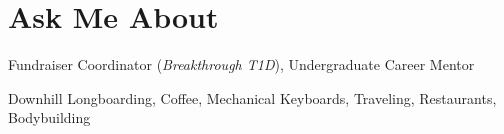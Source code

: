 \documentclass[letterpaper,11pt]{article}
\makeatletter
\newcommand{\resumeItem}[1]{
  \item\small{
    {#1 \vspace{-1pt}}
  }
}
\newcommand{\resumeProjectHeading}[2]{
    \item
    \begin{tabular*}{1.00\textwidth}{l@{\extracolsep{\fill}}r}
      \small#1 & \small{#2} \\
    \end{tabular*}\vspace{-7pt}
}
\newcommand{\resumeSubHeadingListStart}{\begin{itemize}[leftmargin=0in, label={}]\vspace{-3pt}}
\newcommand{\resumeSubHeadingListEnd}{\end{itemize}}
\newcommand{\resumeItemListStart}{\begin{itemize}
[leftmargin=0.2in]}
\newcommand{\resumeItemListEnd}{\end{itemize}}
\makeatother
\begin{document}

\section{Ask Me About}
 \begin{description}[leftmargin=!,labelwidth=\widthof{\small\textit{Activities:XXX}}, itemsep=0.5pt, parsep=0.5pt]
  \small
  \item[Activities:] Fundraiser Coordinator (\textit{Breakthrough T1D}), Undergraduate Career Mentor
  \item[Interests:] Downhill Longboarding, Coffee, Mechanical Keyboards, Traveling, Restaurants, Bodybuilding
\end{description}
\vspace{-10pt}

\end{document}
